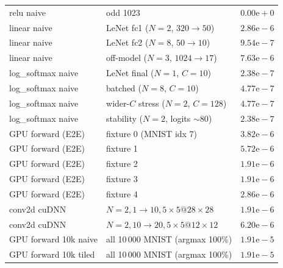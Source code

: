 \documentclass[conference]{IEEEtran}
\begin{document}
\begin{table}[htbp]
\begin{center}
\begin{tabular}{@{}lll@{}}
relu naive       & odd 1023                                    & $0.00\mathrm{e}{+}0$ \\
\addlinespace
linear naive     & LeNet fc1 ($N{=}2$, $320{\to}50$)            & $2.86\mathrm{e}{-}6$ \\
linear naive     & LeNet fc2 ($N{=}8$,  $50{\to}10$)            & $9.54\mathrm{e}{-}7$ \\
linear naive     & off-model ($N{=}3$, $1024{\to}17$)           & $7.63\mathrm{e}{-}6$ \\
\addlinespace
log\_softmax naive & LeNet final ($N{=}1$, $C{=}10$)             & $2.38\mathrm{e}{-}7$ \\
log\_softmax naive & batched ($N{=}8$, $C{=}10$)                 & $4.77\mathrm{e}{-}7$ \\
log\_softmax naive & wider-$C$ stress ($N{=}2$, $C{=}128$)       & $4.77\mathrm{e}{-}7$ \\
log\_softmax naive & stability ($N{=}2$, logits $\sim 80$)       & $2.38\mathrm{e}{-}7$ \\
\addlinespace
GPU forward (E2E) & fixture 0 (MNIST idx 7) & $3.82\mathrm{e}{-}6$ \\
GPU forward (E2E) & fixture 1               & $5.72\mathrm{e}{-}6$ \\
GPU forward (E2E) & fixture 2               & $1.91\mathrm{e}{-}6$ \\
GPU forward (E2E) & fixture 3               & $1.91\mathrm{e}{-}6$ \\
GPU forward (E2E) & fixture 4               & $2.86\mathrm{e}{-}6$ \\
\addlinespace
conv2d cuDNN     & $N{=}2, 1{\to}10, 5{\times}5 @ 28{\times}28$ & $1.91\mathrm{e}{-}6$ \\
conv2d cuDNN     & $N{=}2, 10{\to}20, 5{\times}5 @ 12{\times}12$ & $6.20\mathrm{e}{-}6$ \\
\addlinespace
GPU forward 10k naive & all 10\,000 MNIST (argmax 100\%) & $1.91\mathrm{e}{-}5$ \\
GPU forward 10k tiled & all 10\,000 MNIST (argmax 100\%) & $1.91\mathrm{e}{-}5$ \\
\bottomrule
\end{tabular}
\end{center}
\end{table}
\end{document}
